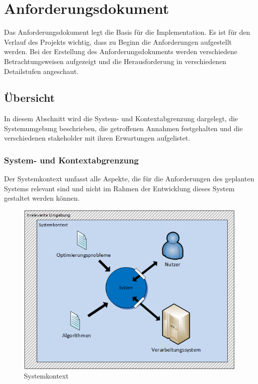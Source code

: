 %
%

\chapter{Anforderungsdokument \resultAssignment{[R3]}}\label{chap.anforderungsdokument}

Das Anforderungsdokument legt die Basis für die Implementation. Es ist für den Verlauf des Projekts wichtig, dass zu Beginn die Anforderungen aufgestellt werden. Bei der 
Erstellung des Anforderungsdokuments werden verschiedene Betrachtungsweisen aufgezeigt und die Herausforderung in verschiedenen Detailstufen angeschaut.


\section{Übersicht}\label{anf_uebersicht}

In diesem Abschnitt  wird die System- und Kontextabgrenzung dargelegt, die Systemumgebung beschrieben, die getroffenen Annahmen festgehalten und die verschiedenen \gls{stakeholder} mit 
ihren Erwartungen aufgelistet.

\subsection{System- und Kontextabgrenzung}\label{systemabgrenzung}
Der Systemkontext umfasst alle Aspekte, die für die Anforderungen des geplanten Systems relevant sind und nicht im Rahmen der Entwicklung dieses System gestaltet werden können.
\cite{req_eng_book} 

\begin{figure}[h]
\centering
\includegraphics[scale=0.8]{images/visio/systemkontext.png}
\caption[Systemkontext]{Systemkontext \selfmade{}}
\label{fig:systemkontext}
\end{figure}

